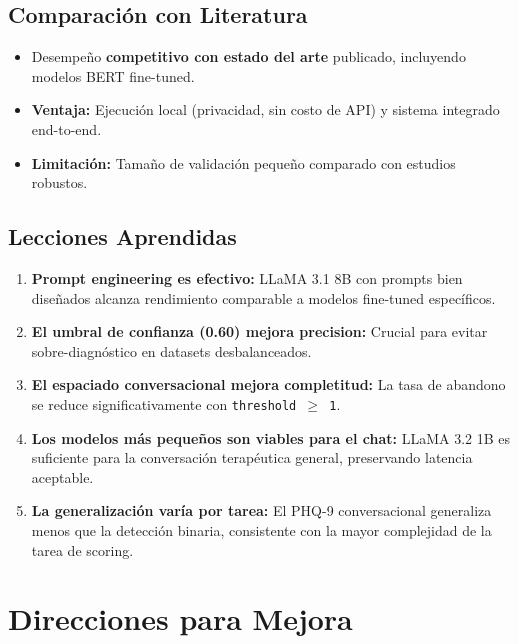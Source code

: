 \subsection{Comparación con Literatura}

\begin{itemize}
    \item Desempeño \textbf{competitivo con estado del arte} publicado, incluyendo
          modelos BERT fine-tuned.
    \item \textbf{Ventaja:} Ejecución local (privacidad, sin costo de API) y
          sistema integrado end-to-end.
    \item \textbf{Limitación:} Tamaño de validación pequeño comparado con
          estudios robustos.
\end{itemize}

\subsection{Lecciones Aprendidas}

\begin{enumerate}
    \item \textbf{Prompt engineering es efectivo:} LLaMA 3.1 8B con prompts bien
          diseñados alcanza rendimiento comparable a modelos fine-tuned específicos.

    \item \textbf{El umbral de confianza (0.60) mejora precision:} Crucial para
          evitar sobre-diagnóstico en datasets desbalanceados.

    \item \textbf{El espaciado conversacional mejora completitud:} La tasa de abandono
          se reduce significativamente con \texttt{threshold $\geq$ 1}.

    \item \textbf{Los modelos más pequeños son viables para el chat:} LLaMA 3.2 1B
          es suficiente para la conversación terapéutica general, preservando latencia
          aceptable.

    \item \textbf{La generalización varía por tarea:} El PHQ-9 conversacional generaliza
          menos que la detección binaria, consistente con la mayor complejidad de
          la tarea de scoring.
\end{enumerate}

\section{Direcciones para Mejora}

